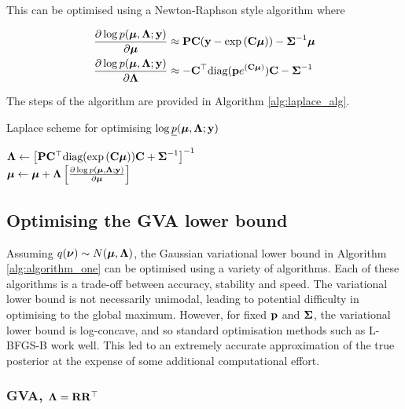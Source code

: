\documentclass{article}[12pt]
\begin{document}
\noindent This can be optimised using a Newton-Raphson style algorithm where

\begin{align*}
\frac{\partial \log p({\boldsymbol \mu}, {\boldsymbol \Lambda}; {\bf y})}{\partial {\boldsymbol\mu}} &\approx {\bf P} {\bf C} ({\bf y} - \exp{({\bf C}{\boldsymbol\mu})}) - {\boldsymbol \Sigma}^{-1} {\boldsymbol \mu} \\
\frac{\partial \log p({\boldsymbol \mu}, {\boldsymbol \Lambda}; {\bf y})}{\partial {\boldsymbol\Lambda}} &\approx - {\bf C}^\top \text{diag}({\bf p} e^{({\bf C} {\boldsymbol \mu})}) {\bf C} - {\boldsymbol \Sigma}^{-1}
\end{align*}

The steps of the algorithm are provided in Algorithm \ref{alg:laplace_alg}.

\begin{algorithm}
\caption{Laplace scheme for optimising $\log \underline{p}({\boldsymbol \mu}, {\boldsymbol \Lambda}; {\bf y})$}
\label{alg:laplace_alg}
\begin{algorithmic}
\STATE ${\boldsymbol \Lambda} \leftarrow \left [{\bf P} {\bf C}^\top \text{diag}(\exp{({\bf C}{\boldsymbol\mu})}) {\bf C} + {\boldsymbol \Sigma}^{-1} \right ]^{-1}$ \\ [1ex] 
\STATE ${\boldsymbol \mu} \leftarrow {\boldsymbol\mu} + {\boldsymbol \Lambda} \left [ \frac{\partial \log p({\boldsymbol \mu}, {\boldsymbol \Lambda}; {\bf y})}{\partial {\boldsymbol\mu}}  \right ]$ \\ [1ex]
\ENDWHILE
\end{algorithmic}
\end{algorithm}

\subsection{Optimising the GVA lower bound}
Assuming $q({\boldsymbol \nu}) \sim N({\boldsymbol \mu}, {\boldsymbol \Lambda})$, the Gaussian variational lower bound in Algorithm
\ref{alg:algorithm_one} can be optimised using a  variety of algorithms. Each of these algorithms is a
trade-off between accuracy,  stability and speed. The variational lower bound is not necessarily unimodal,
leading to potential difficulty in optimising to the global maximum. However, for fixed
${\bf p}$ and ${\boldsymbol \Sigma}$, the variational lower bound is log-concave, and so standard
optimisation methods such as L-BFGS-B work well. This led to an extremely accurate approximation
of the true posterior at the expense of some additional computational effort.

\subsubsection{GVA, ${\boldsymbol \Lambda} = {\bf R} {\bf R}^\top$}
\end{document}
